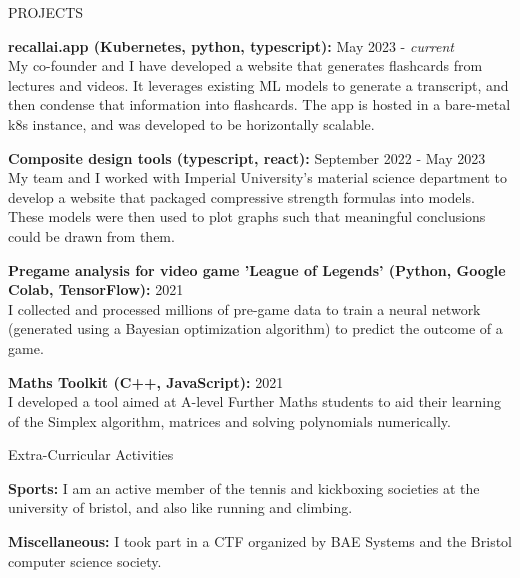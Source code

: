 \documentclass{resume} %
\begin{document}
\begin{rSection}{PROJECTS}
\vspace{-1.25em}

\item \textbf{recallai.app (Kubernetes, python, typescript):} \hfill May 2023 - \textit{current} \\
{My co-founder and I have developed a website that generates flashcards from lectures and videos. It leverages existing ML models to generate a transcript, and then condense that information into flashcards. The app is hosted in a bare-metal k8s instance, and was developed to be horizontally scalable.}

\item \textbf{Composite design tools (typescript, react):} \hfill September 2022 - May 2023 \\
{My team and I worked with Imperial University's material science department to develop a website that packaged compressive strength formulas into models. These models were then used to plot graphs such that meaningful conclusions could be drawn from them.}

\item \textbf{Pregame analysis for video game 'League of Legends' (Python, Google Colab, TensorFlow):} \hfill 2021 \\
{I collected and processed millions of pre-game data to train a neural network (generated using a Bayesian optimization algorithm) to predict the outcome of a game.}%

\item \textbf{Maths Toolkit (C++, JavaScript):} \hfill 2021 \\
{I developed a tool aimed at A-level Further Maths students to aid their learning of the Simplex algorithm, matrices and solving polynomials numerically.}

\end{rSection}

\begin{rSection}{Extra-Curricular Activities} 
\vspace{-1.25em}

\item{\textbf{Sports:}}
I am an active member of the tennis and kickboxing societies at the university of bristol, and also like running and climbing. \\

\vspace{-1.25em}

\item{\textbf{Miscellaneous:}}
I took part in a CTF organized by BAE Systems and the Bristol computer science society. \\

\end{rSection}
\end{document}
